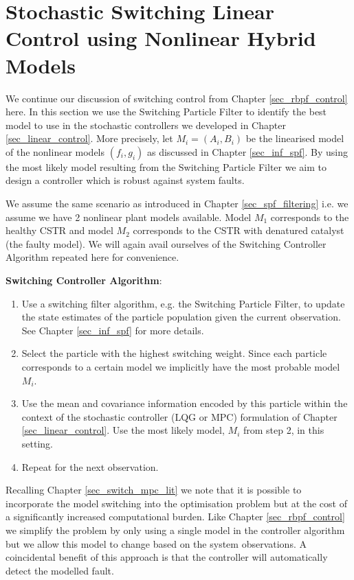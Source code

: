 \chapter{Stochastic Switching Linear Control using Nonlinear Hybrid Models}
\label{sec_spf_control}
We continue our discussion of switching control from Chapter \ref{sec_rbpf_control} here. In this section we use the Switching Particle Filter to identify the best model to use in the stochastic controllers we developed in Chapter \ref{sec_linear_control}. More precisely, let $M_i = (A_i, B_i)$ be the linearised model of the nonlinear models $(f_i, g_i)$ as discussed in Chapter \ref{sec_inf_spf}. By using the most likely model resulting from the Switching Particle Filter we aim to design a controller which is robust against system faults.

We assume the same scenario as introduced in Chapter \ref{sec_spf_filtering} i.e. we assume we have 2 nonlinear plant models available. Model $M_1$ corresponds to the healthy CSTR and model $M_2$ corresponds to the CSTR with denatured catalyst (the faulty model). We will again avail ourselves of the Switching Controller Algorithm  repeated here for convenience.

\textbf{Switching Controller Algorithm}:
\begin{enumerate}
\item
Use a switching filter algorithm, e.g. the Switching Particle Filter, to update the state estimates of the particle population given the current observation. See Chapter \ref{sec_inf_spf} for more details.
\item
Select the particle with the highest switching weight. Since each particle corresponds to a certain model we implicitly have the most probable model $M_i$.
\item
Use the mean and covariance information encoded by this particle within the context of the stochastic controller (LQG or MPC) formulation of Chapter \ref{sec_linear_control}. Use the most likely model, $M_i$ from step 2, in this setting.
\item
Repeat for the next observation. 
\end{enumerate} 
Recalling Chapter \ref{sec_switch_mpc_lit} we note that it is possible to incorporate the model switching into the optimisation problem but at the cost of a significantly increased computational burden. Like Chapter \ref{sec_rbpf_control} we simplify the problem by only using a single model in the controller algorithm but we allow this model to change based on the system observations. A coincidental benefit of this approach is that the controller will automatically detect the modelled fault. 

